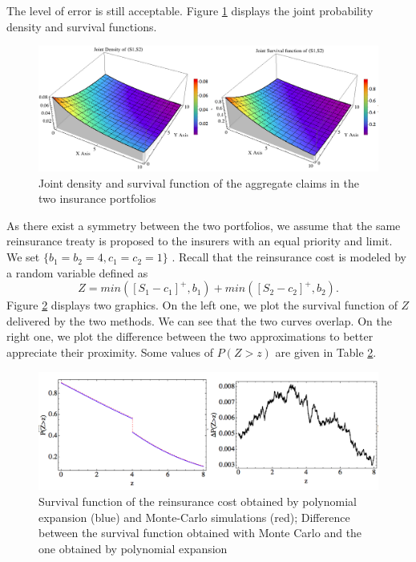 The level of error is still acceptable. Figure \ref{3DPlotReinsuranceApplication} displays the joint probability density and survival functions. 
\begin{center}
	\begin{figure}[h!]
		\begin{center}
			\includegraphics[width=16cm]{Chapitre5/Graph3DPDFSurvivalAggregateClaim.png}
			\caption{Joint density and survival function of the aggregate claims in the two insurance portfolios}\label{3DPlotReinsuranceApplication}
		\end{center}
	\end{figure}
\end{center}
As there exist a symmetry between the two portfolios, we assume that the same reinsurance treaty is proposed to the insurers with an equal priority and limit. We set $\{b_{1}=b_{2}=4, c_{1}=c_{2}=1\}$ . Recall that the reinsurance cost is modeled by a random variable defined as 
\begin{equation}\label{ReinsuranceCostZ}
Z=min\left(\left[S_{1}-c_{1}\right]^{+},b_{1}\right)+min\left(\left[S_{2}-c_{2}\right]^{+},b_{2}\right).
\end{equation}
Figure \ref{ReinsuranceCostApplication} displays two graphics. On the left one, we plot the survival function of $Z$ delivered by the two methods. We can see that the two curves overlap. On the right one, we plot the difference between the two approximations to better appreciate their proximity. Some values of $P(Z>z)$ are given in Table \ref{ReinsuranceCostApplication}. 
\begin{center}
	\begin{figure}[h!]
		\begin{center}
			\includegraphics[width=14cm]{Chapitre5/GraphReinsuranceCost.png}
			\caption{Survival function of the reinsurance cost obtained by polynomial  expansion (blue) and Monte-Carlo simulations (red); Difference between the survival function obtained with Monte Carlo and the one obtained by polynomial expansion}\label{ReinsuranceCostApplication}
		\end{center}
	\end{figure}
\end{center}
